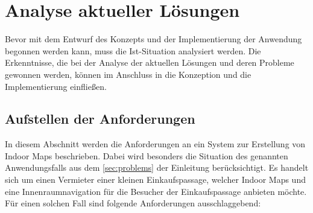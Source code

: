 \chapter{Analyse aktueller Lösungen}
\label{ch:analysis}
Bevor mit dem Entwurf des Konzepts und der Implementierung der Anwendung begonnen werden kann, muss die Ist-Situation analysiert werden.
Die Erkenntnisse, die bei der Analyse der aktuellen Lösungen und deren Probleme gewonnen werden, können im Anschluss in die Konzeption und die Implementierung einfließen.

\section{Aufstellen der Anforderungen}
In diesem Abschnitt werden die Anforderungen an ein System zur Erstellung von Indoor Maps beschrieben.
Dabei wird besonders die Situation des genannten Anwendungsfalls aus dem \autoref{sec:problems} der Einleitung berücksichtigt.
Es handelt sich um einen Vermieter einer kleinen Einkaufspassage, welcher Indoor Maps und eine Innenraumnavigation für die Besucher der Einkaufspassage anbieten möchte.
Für einen solchen Fall sind folgende Anforderungen ausschlaggebend:
